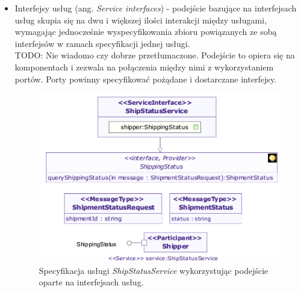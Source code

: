 \begin{itemize}
\item{Interfejsy usług (ang. \emph{Service interfaces}) - podejście bazujące na interfejsach usług skupia się na dwu i większej ilości interakcji między usługami, wymagając jednocześnie wyspecyfikowania zbioru powiązanych ze sobą interfejsów w ramach specyfikacji jednej usługi. \\TODO: Nie wiadomo czy dobrze przetłumaczone. Podejście to opiera się na komponentach i zezwala na połączenia między nimi z wykorzystaniem portów. Porty powinny specyfikować pożądane i dostarczane interfejsy. 
\begin{figure}[h!tbp]
\begin{centering}
\includegraphics[width=11cm]{img/service_interface_based_approach.png}
\caption[Specyfikacja usługi \emph{ShipStatusService} wykorzystując podejście oparte na interfejsach usług.]{Specyfikacja usługi \emph{ShipStatusService} wykorzystując podejście oparte na interfejsach usług.\cite{SoaMLErvBase}}\label{service_interface_based_approach}
\end{centering}
\end{figure}} 


\end{itemize}
